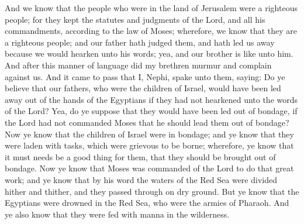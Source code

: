 And we know that the people who were in the land of Jerusalem were a righteous people; for they kept the statutes and judgments of the Lord, and all his commandments, according to the law of Moses; wherefore, we know that they are a righteous people; and our father hath judged them, and hath led us away because we would hearken unto his words; yea, and our brother is like unto him. And after this manner of language did my brethren murmur and complain against us.
\bverse \iffalse And it came to pass that I, Nephi, spake unto them, saying: Do ye believe that our fathers, who were the children of Israel, would have been led away out of the hands of the Egyptians if they had not hearkened unto the words of the Lord? \fi
And it came to pass that I, Nephi, spake unto them, saying: Do ye believe that our fathers, who were the children of Israel, would have been led away out of the hands of the Egyptians if they had not hearkened unto the words of the Lord?
\bverse \iffalse Yea, do ye suppose that they would have been led out of bondage, if the Lord had not commanded Moses that he should lead them out of bondage? \fi
Yea, do ye suppose that they would have been led out of bondage, if the Lord had not commanded Moses that he should lead them out of bondage?
\bverse \iffalse Now ye know that the children of Israel were in bondage; and ye know that they were laden with tasks, which were grievous to be borne; wherefore, ye know that it must needs be a good thing for them, that they should be brought out of bondage. \fi
Now ye know that the children of Israel were in bondage; and ye know that they were laden with tasks, which were grievous to be borne; wherefore, ye know that it must needs be a good thing for them, that they should be brought out of bondage.
\bverse \iffalse Now ye know that Moses was commanded of the Lord to do that great work; and ye know that by his word the waters of the Red Sea were divided hither and thither, and they passed through on dry ground. \fi
Now ye know that Moses was commanded of the Lord to do that great work; and ye know that by his word the waters of the Red Sea were divided hither and thither, and they passed through on dry ground.
\bverse \iffalse But ye know that the Egyptians were drowned in the Red Sea, who were the armies of Pharaoh. \fi
But ye know that the Egyptians were drowned in the Red Sea, who were the armies of Pharaoh.
\bverse \iffalse And ye also know that they were fed with manna in the wilderness. \fi
And ye also know that they were fed with manna in the wilderness.
